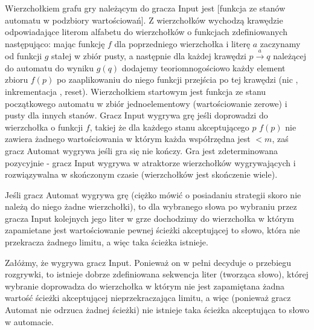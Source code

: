 \documentclass{article}
\begin{document}
Wierzchołkiem grafu gry należącym do gracza Input jest [funkcja ze stanów automatu w podzbiory wartościowań].
Z wierzchołków wychodzą krawędzie odpowiadające literom alfabetu do wierzchołków o funkcjach zdefiniowanych następująco:\newline
mając funkcję $f$ dla poprzedniego wierzchołka i literę $a$ zaczynamy od funkcji $g$ stałej w zbiór pusty, a następnie dla każdej krawędzi
$p\xrightarrow{a}q$ należącej do automatu do wyniku $g(q)$ dodajemy teoriomnogościowo każdy element zbioru
$f(p)$ po zaaplikowaniu do niego funkcji przejścia po tej krawędzi (nic , inkrementacja , reset).
Wierzchołkiem startowym jest funkcja ze stanu początkowego automatu w zbiór jednoelementowy (wartościowanie zerowe) i pusty dla innych stanów.
Gracz Input wygrywa grę jeśli doprowadzi do wierzchołka o funkcji $f$, takiej że dla każdego stanu akceptującego $p$ $f(p)$
nie zawiera żadnego wartościowania w którym każda współrzędna jest $<m$, zaś gracz Automat wygrywa jeśli gra się nie kończy.
Gra jest zdeterminowana pozycyjnie - gracz Input wygrywa w atraktorze wierzchołków wygrywających
i rozwiązywalna w skończonym czasie (wierzchołków jest skończenie wiele).\newline

Jeśli gracz Automat wygrywa grę (ciężko mówić o posiadaniu strategii skoro nie należą do niego żadne wierzchołki),
to dla wybranego słowa po wybraniu przez gracza Input kolejnych jego liter w grze dochodzimy do wierzchołka w którym
zapamietane jest wartościowanie pewnej ścieżki akceptującej to słowo, która nie przekracza żadnego limitu, a więc taka ścieżka istnieje.\newline

Załóżmy, że wygrywa gracz Input. Ponieważ on w pełni decyduje o przebiegu rozgrywki, to istnieje dobrze zdefiniowana sekwencja liter
(tworząca słowo), której wybranie doprowadza do wierzchołka w którym nie jest zapamiętana żadna
wartość ścieżki akceptującej nieprzekraczająca limitu, a więc (ponieważ gracz Automat nie odrzuca żadnej ścieżki)
nie istnieje taka ścieżka akceptująca to słowo w automacie.
\end{document}
